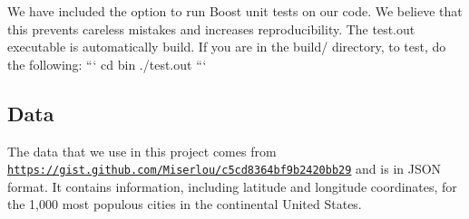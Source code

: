 We have included the option to run Boost unit tests on our code. We believe that this prevents careless mistakes and increases reproducibility. The test.\-out executable is automatically build. If you are in the build/ directory, to test, do the following\-: ``` cd bin ./test.out ``` \subsection*{Data}

The data that we use in this project comes from \href{https://gist.github.com/Miserlou/c5cd8364bf9b2420bb29}{\tt https\-://gist.\-github.\-com/\-Miserlou/c5cd8364bf9b2420bb29} and is in J\-S\-O\-N format. It contains information, including latitude and longitude coordinates, for the 1,000 most populous cities in the continental United States. 